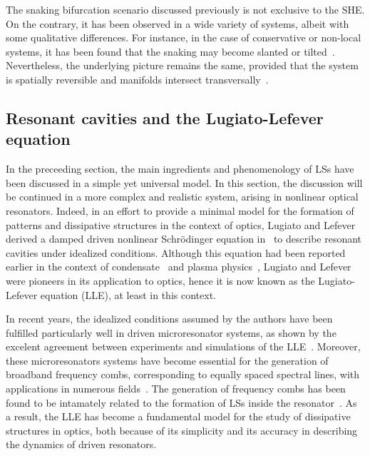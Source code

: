The snaking bifurcation scenario discussed previously is not exclusive to the SHE. 
On the contrary, it has been observed in a wide variety of systems, albeit with 
some qualitative differences. For instance, in the case of conservative or non-local systems,
it has been found that the snaking may become slanted or 
tilted~\cite{firth2007proposed,dawes2008localized,beaume2013convectons}. 
Nevertheless, the underlying picture remains the same,
provided that the system is spatially reversible and manifolds intersect 
transversally~\cite{knobloch2015spatial}.



\subsection{Resonant cavities and the Lugiato-Lefever equation}

In the preceeding section, the main ingredients and phenomenology of LSs have been discussed
in a simple yet universal model. In this section, the discussion will be continued in a
more complex and realistic system, arising in nonlinear optical resonators. Indeed, in an effort
to provide a minimal model for the formation of patterns and dissipative
structures in the context of optics, Lugiato and Lefever derived a damped driven nonlinear
Schrödinger equation in~\cite{lugiatolefever1987} to describe resonant cavities under idealized conditions.
Although this equation had been reported earlier in the context of condensate~\cite{kaup1978theory}
and plasma physics~\cite{morales1974ponderomotive}, Lugiato and Lefever were pioneers in its application
to optics, hence it is now known as the Lugiato-Lefever equation (LLE), at least in this context. 


In recent years, the idealized conditions assumed by the authors have been fulfilled particularly well in driven microresonator
systems, as shown by the excelent agreement between experiments and simulations of the LLE~\cite{grudinin2017high}.
Moreover, these microresonators
systems have become essential for the generation of broadband frequency combs, corresponding to equally
spaced spectral lines, with applications in numerous
fields~\cite{Jost2015clock,marin2017microresonator,suh2019searching}. The generation of frequency combs
has been found to be intamately related to the formation of LSs inside the 
resonator~\cite{coen2012modeling,coen2013universal,chembo2013spatiotemporal}.
As a result,
the LLE has become a fundamental model for the study of dissipative structures in optics, both 
because of its simplicity and its accuracy in describing the dynamics of driven resonators. 

